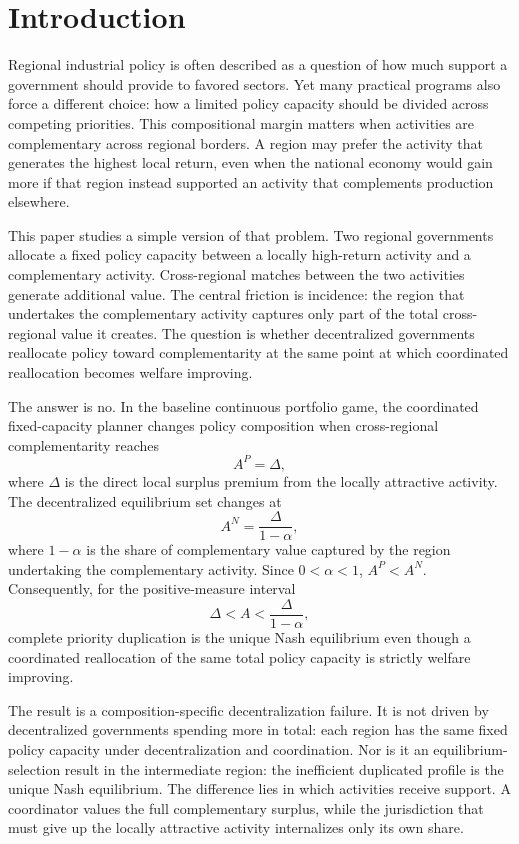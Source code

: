 \section{Introduction}
\label{sec:introduction}

Regional industrial policy is often described as a question of how much support a government should provide to favored sectors. Yet many practical programs also force a different choice: how a limited policy capacity should be divided across competing priorities. This compositional margin matters when activities are complementary across regional borders. A region may prefer the activity that generates the highest local return, even when the national economy would gain more if that region instead supported an activity that complements production elsewhere.

This paper studies a simple version of that problem. Two regional governments allocate a fixed policy capacity between a locally high-return activity and a complementary activity. Cross-regional matches between the two activities generate additional value. The central friction is incidence: the region that undertakes the complementary activity captures only part of the total cross-regional value it creates. The question is whether decentralized governments reallocate policy toward complementarity at the same point at which coordinated reallocation becomes welfare improving.

The answer is no. In the baseline continuous portfolio game, the coordinated fixed-capacity planner changes policy composition when cross-regional complementarity reaches
\[
A^P=\Delta,
\]
where $\Delta$ is the direct local surplus premium from the locally attractive activity. The decentralized equilibrium set changes at
\[
A^N=\frac{\Delta}{1-\alpha},
\]
where $1-\alpha$ is the share of complementary value captured by the region undertaking the complementary activity. Since $0<\alpha<1$, $A^P<A^N$. Consequently, for the positive-measure interval
\[
\Delta<A<\frac{\Delta}{1-\alpha},
\]
complete priority duplication is the unique Nash equilibrium even though a coordinated reallocation of the same total policy capacity is strictly welfare improving.

The result is a composition-specific decentralization failure. It is not driven by decentralized governments spending more in total: each region has the same fixed policy capacity under decentralization and coordination. Nor is it an equilibrium-selection result in the intermediate region: the inefficient duplicated profile is the unique Nash equilibrium. The difference lies in which activities receive support. A coordinator values the full complementary surplus, while the jurisdiction that must give up the locally attractive activity internalizes only its own share.

